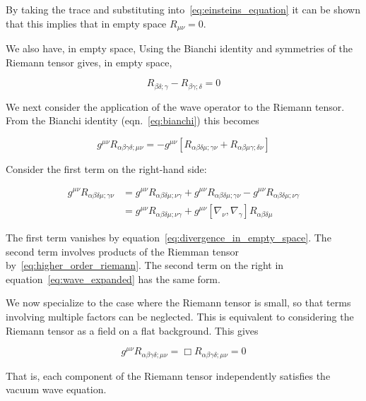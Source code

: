 By taking the trace and substituting into~\ref{eq:einsteins_equation}
it can be shown that this implies that in empty space $R_{\mu\nu} =
0$.

We also have, in empty space, 
Using the Bianchi identity and
symmetries of the Riemann tensor gives, in empty space,

\begin{equation}
\label{eq:divergence_in_empty_space}
R_{\beta\delta;\gamma}  -R_{\beta\gamma;\delta} = 0
\end{equation}

We next consider the application of the wave operator to the Riemann
tensor.  From the Bianchi identity (eqn.~\ref{eq:bianchi}) this becomes

\begin{equation*}
\label{eq:wave_expanded}
g^{\mu\nu} R_{\alpha\beta\gamma\delta;\mu\nu}
= - g^{\mu\nu}
\left[R_{\alpha\beta\delta\mu;\gamma\nu}
+ R_{\alpha\beta\mu\gamma;\delta\nu} \right]
\end{equation*}

Consider the first term on the right-hand side:

\begin{align*}
g^{\mu\nu} R_{\alpha\beta\delta\mu;\gamma\nu}
&= g^{\mu\nu} R_{\alpha\beta\delta\mu;\nu\gamma}
+ g^{\mu\nu} R_{\alpha\beta\delta\mu;\gamma\nu}
- g^{\mu\nu} R_{\alpha\beta\delta\mu;\nu\gamma} \\
&= g^{\mu\nu} R_{\alpha\beta\delta\mu;\nu\gamma}
+ g^{\mu\nu} 
\left[\nabla_\nu,\nabla_\gamma\right] R_{\alpha\beta\delta\mu}
\end{align*}

The first term vanishes by
equation~\ref{eq:divergence_in_empty_space}.  The second term involves
products of the Riemman tensor by~\ref{eq:higher_order_riemann}.  The
second term on the right in equation~\ref{eq:wave_expanded} has the
same form.

We now specialize to the case where the Riemann tensor is small, so
that terms involving multiple factors can be neglected.  This is
equivalent to considering the Riemann tensor as a field on a flat
background.  This gives

\begin{equation}
\label{eq:riemann_wave}
g^{\mu\nu}
R_{\alpha\beta\gamma\delta;\mu\nu}
=
\Box R_{\alpha\beta\gamma\delta;\mu\nu}
= 0
\end{equation}

That is, each component of the Riemann tensor independently 
satisfies the vacuum wave equation.

